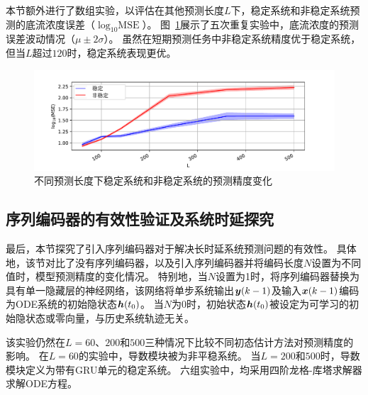 本节额外进行了数组实验，以评估在其他预测长度$L$下，稳定系统和非稳定系统预测的底流浓度误差（$\log_{10}{\text{MSE}}$）。
图~\ref{fig:length_cmp}展示了五次重复实验中，底流浓度的预测误差波动情况（$\mu \pm 2\sigma$）。
虽然在短期预测任务中非稳定系统精度优于稳定系统，但当$L$超过$120$时，稳定系统表现更优。
\begin{figure}[h]
    \centering
    \includegraphics[width=\linewidth,trim=50 0 50 10, clip]{figures/chapter3/length_cmp.pdf}
    \caption{
    不同预测长度下稳定系统和非稳定系统的预测精度变化
    }
    \label{fig:length_cmp}
\end{figure}




\subsection{序列编码器的有效性验证及系统时延探究}
\label{sec:3_enc_length}
最后，本节探究了引入序列编码器对于解决长时延系统预测问题的有效性。
具体地，该节对比了没有序列编码器，以及引入序列编码器并将编码长度$N$设置为不同值时，模型预测精度的变化情况。
特别地，当$N$设置为1时，将序列编码器替换为具有单一隐藏层的神经网络，该网络将单步系统输出$\boldsymbol y(k-1)$及输入$\boldsymbol x(k-1)$编码为ODE系统的初始隐状态$\boldsymbol h(t_0)$。
当$N$为0时，初始状态$\boldsymbol h(t_0)$被设定为可学习的初始隐状态\cite{Demeester2020SystemIW}或零向量，与历史系统轨迹无关。

该实验仍然在$L=60$、$200$和$500$三种情况下比较不同初态估计方法对预测精度的影响。
在$L=60$的实验中，导数模块被为非平稳系统。
当$L=200$和$500$时，导数模块定义为带有GRU单元的稳定系统。
六组实验中，均采用四阶龙格-库塔求解器求解ODE方程。



